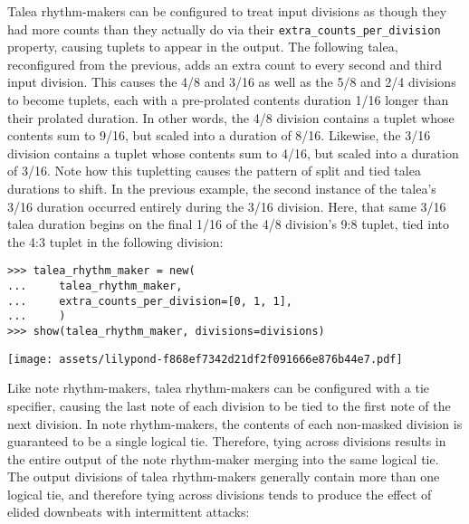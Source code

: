 \noindent Talea rhythm-makers can be configured to treat input divisions as
though they had more counts than they actually do via their
\texttt{extra\_counts\_per\_division} property, causing tuplets to appear in
the output. The following talea, reconfigured from the previous, adds an extra
count to every second and third input division. This causes the 4/8 and 3/16 as
well as the 5/8 and 2/4 divisions to become tuplets, each with a pre-prolated
contents duration 1/16 longer than their prolated duration. In other words, the 4/8
division contains a tuplet whose contents sum to 9/16, but scaled into a
duration of 8/16. Likewise, the 3/16 division contains a tuplet whose contents
sum to 4/16, but scaled into a duration of 3/16. Note how this tupletting
causes the pattern of split and tied talea durations to shift. In the previous
example, the second instance of the talea's 3/16 duration occurred entirely
during the 3/16 division. Here, that same 3/16 talea duration begins on the
final 1/16 of the 4/8 division's 9:8 tuplet, tied into the 4:3 tuplet in the
following division:

\begin{comment}
<abjad>
talea_rhythm_maker = new(
    talea_rhythm_maker,
    extra_counts_per_division=[0, 1, 1],
    )
show(talea_rhythm_maker, divisions=divisions)
</abjad>
\end{comment}

\begin{abjadbookoutput}
\begin{singlespacing}
\vspace{-0.5\baselineskip}
\begin{lstlisting}
>>> talea_rhythm_maker = new(
...     talea_rhythm_maker,
...     extra_counts_per_division=[0, 1, 1],
...     )
>>> show(talea_rhythm_maker, divisions=divisions)
\end{lstlisting}
\noindent\texttt{[image: assets/lilypond-f868ef7342d21df2f091666e876b44e7.pdf]}
\end{singlespacing}
\end{abjadbookoutput}

\noindent Like note rhythm-makers, talea rhythm-makers can be configured with a
tie specifier, causing the last note of each division to be tied to the first
note of the next division. In note rhythm-makers, the contents of each
non-masked division is guaranteed to be a single logical tie. Therefore, tying
across divisions results in the entire output of the note rhythm-maker merging
into the same logical tie. The output divisions of talea rhythm-makers
generally contain more than one logical tie, and therefore tying across
divisions tends to produce the effect of elided downbeats with intermittent
attacks:

